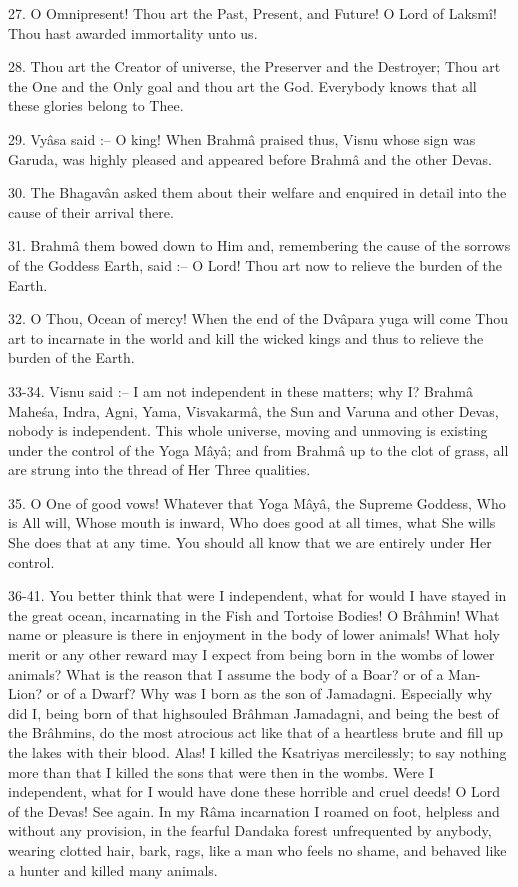 27. O Omnipresent! Thou art the Past, Present, and Future! O Lord of Laksm\^i! Thou hast awarded immortality unto us.

28. Thou art the Creator of universe, the Preserver and the Destroyer; Thou art the One and the Only goal and thou art the God. Everybody knows that all these glories belong to Thee.

29. Vy\^asa said :-- O king! When Brahm\^a praised thus, Visnu whose sign was Garuda, was highly pleased and appeared before Brahm\^a and the other Devas.

30. The Bhagav\^an asked them about their welfare and enquired in detail into the cause of their arrival there.

31. Brahm\^a them bowed down to Him and, remembering the cause of the sorrows of the Goddess Earth, said :-- O Lord! Thou art now to relieve the burden of the Earth.

32. O Thou, Ocean of mercy! When the end of the Dv\^apara yuga will come Thou art to incarnate in the world and kill the wicked kings and thus to relieve the burden of the Earth.

33-34. Visnu said :-- I am not independent in these matters; why I? Brahm\^a Mahe\'sa, Indra, Agni, Yama, Visvakarm\^a, the Sun and Varuna and other Devas, nobody is independent. This whole universe, moving and unmoving is existing under the control of the Yoga M\^ay\^a; and from Brahm\^a up to the clot of grass, all are strung into the thread of Her Three qualities.

35. O One of good vows! Whatever that Yoga M\^ay\^a, the Supreme Goddess, Who is All will, Whose mouth is inward, Who does good at all times, what She wills She does that at any time. You should all know that we are entirely under Her control.

36-41. You better think that were I independent, what for would I have stayed in the great ocean, incarnating in the Fish and Tortoise Bodies! O Br\^ahmin! What name or pleasure is there in enjoyment in the body of lower animals! What holy merit or any other reward may I expect from being born in the wombs of lower animals? What is the reason that I assume the body of a Boar? or of a Man-Lion? or of a Dwarf? Why was I born as the son of Jamadagni. Especially why did I, being born of that highsouled Br\^ahman Jamadagni, and being the best of the Br\^ahmins, do the most atrocious act like that of a heartless brute and fill up the lakes with their blood. Alas! I killed the Ksatriyas mercilessly; to say nothing more than that I killed the sons that were then in the wombs. Were I independent, what for I would have done these horrible and cruel deeds! O Lord of the Devas! See again. In my R\^ama incarnation I roamed on foot, helpless and without any provision, in the fearful Dandaka forest unfrequented by anybody, wearing clotted hair, bark, rags, like a man who feels no shame, and behaved like a hunter and killed many animals.

